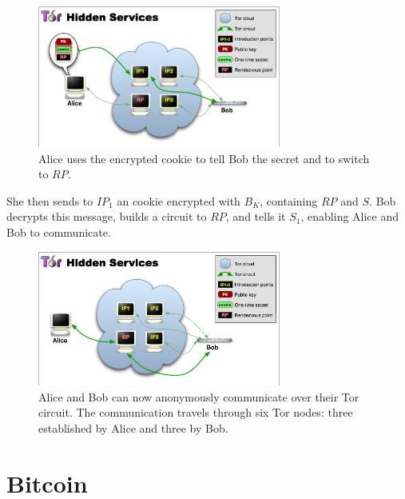 \begin{figure}[htbp]
\centering
\begin{minipage}{8 cm}
  \includegraphics[width=80mm]{images/tor-hidden-service-4-higher.png}
  \caption{Alice uses the encrypted cookie to tell Bob the secret and to switch to $RP$.\cite{TorOverview}}
\end{minipage}
\end{figure}

She then sends to $IP_{1}$ an cookie encrypted with $B_{K}$, containing $RP$ and $S$. Bob decrypts this message, builds a circuit to $RP$, and tells it $S_{1}$, enabling Alice and Bob to communicate.

\begin{figure}[htbp]
\centering
\begin{minipage}{8 cm}
  \includegraphics[width=80mm]{images/tor-hidden-service-6.png}
  \caption{Alice and Bob can now anonymously communicate over their Tor circuit. The communication travels through six Tor nodes: three established by Alice and three by Bob.\cite{TorOverview}}
\end{minipage}
\end{figure}






\section{Bitcoin}

